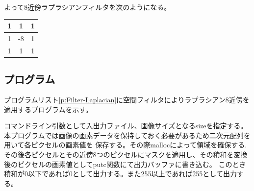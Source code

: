 \documentclass[11pt,a4paper,titlepage,dvipdfmx]{jarticle}
\begin{document}
    よって8近傍ラプラシアンフィルタを次のようになる。
    \begin{table}[H]
      \centering
      \begin{tabular}{|c|c|c|}
      \hline
      1 & 1  & 1 \\\hline
      1 & -8 & 1 \\\hline
      1 & 1  & 1 \\\hline
      \end{tabular}
    \end{table}

  \subsection{プログラム}
    プログラムリスト\ref{p:Filter-Laplacian}に空間フィルタによりラプラシアン8近傍を適用するプログラムを示す。
    

    コマンドライン引数として入出力ファイル、画像サイズとなるsizeを指定する。本プログラムでは画像の画素データを保持しておく必要があるため二次元配列を用いて各ピクセルの画素値を
    保存する。その際mallocによって領域を確保する.その後各ピクセルとその近傍8つのピクセルにマスクを適用し、その積和を変換後のピクセルの画素値としてputc関数にて出力バッファに書き込む。
    このとき積和が0以下であれば0として出力する。また255以上であれば255として出力する。
  
\end{document}
